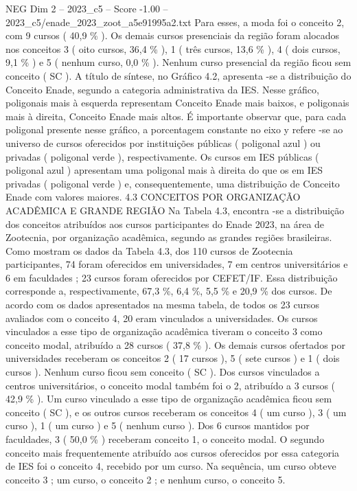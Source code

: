 \begin{textsample}{NEG Dim 2 – 2023\_c5 – Score -1.00 – 2023\_c5/enade\_2023\_zoot\_a5e91995a2.txt}
Para esses, a moda foi o conceito 2, com 9 cursos ( 40,9 \% ).
Os demais cursos presenciais da região foram alocados nos conceitos 3 ( oito cursos, 36,4 \% ), 1 ( três cursos, 13,6 \% ), 4 ( dois cursos, 9,1 \% ) e 5 ( nenhum curso, 0,0 \% ).
Nenhum curso presencial da região ficou sem conceito ( SC ).
A título de síntese, no Gráfico 4.2, apresenta -se a distribuição do Conceito Enade, segundo a categoria administrativa da IES.
Nesse gráfico, poligonais mais à esquerda representam Conceito Enade mais baixos, e poligonais mais à direita, Conceito Enade mais altos.
É importante observar que, para cada poligonal presente nesse gráfico, a porcentagem constante no eixo y refere -se ao universo de cursos oferecidos por instituições públicas ( poligonal azul ) ou privadas ( poligonal verde ), respectivamente.
Os cursos em IES públicas ( poligonal azul ) apresentam uma poligonal mais à direita do que os em IES privadas ( poligonal verde ) e, consequentemente, uma distribuição de Conceito Enade com valores maiores. 4.3 CONCEITOS POR ORGANIZAÇÃO ACADÊMICA E GRANDE REGIÃO Na Tabela 4.3, encontra -se a distribuição dos conceitos atribuídos aos cursos participantes do Enade 2023, na área de Zootecnia, por organização acadêmica, segundo as grandes regiões brasileiras.
Como mostram os dados da Tabela 4.3, dos 110 cursos de Zootecnia participantes, 74 foram oferecidos em universidades, 7 em centros universitários e 6 em faculdades ; 23 cursos foram oferecidos por CEFET/IF.
Essa distribuição corresponde a, respectivamente, 67,3 \%, 6,4 \%, 5,5 \% e 20,9 \% dos cursos.
De acordo com os dados apresentados na mesma tabela, de todos os 23 cursos avaliados com o conceito 4, 20 eram vinculados a universidades.
Os cursos vinculados a esse tipo de organização acadêmica tiveram o conceito 3 como conceito modal, atribuído a 28 cursos ( 37,8 \% ).
Os demais cursos ofertados por universidades receberam os conceitos 2 ( 17 cursos ), 5 ( sete cursos ) e 1 ( dois cursos ).
Nenhum curso ficou sem conceito ( SC ).
Dos cursos vinculados a centros universitários, o conceito modal também foi o 2, atribuído a 3 cursos ( 42,9 \% ).
Um curso vinculado a esse tipo de organização acadêmica ficou sem conceito ( SC ), e os outros cursos receberam os conceitos 4 ( um curso ), 3 ( um curso ), 1 ( um curso ) e 5 ( nenhum curso ).
Dos 6 cursos mantidos por faculdades, 3 ( 50,0 \% ) receberam conceito 1, o conceito modal.
O segundo conceito mais frequentemente atribuído aos cursos oferecidos por essa categoria de IES foi o conceito 4, recebido por um curso.
Na sequência, um curso obteve conceito 3 ; um curso, o conceito 2 ; e nenhum curso, o conceito 5.

\end{textsample}
